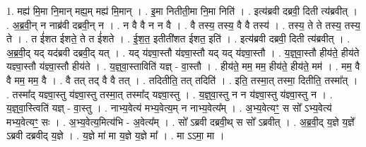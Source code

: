 \documentclass[17pt]{extarticle}
\begin{document}
1. मह्य॑ मि॒मा नि॒मान् मह्य॒म् मह्य॑ मि॒मान् । . इ॒मा नितीती॒मा नि॒मा निति॑ । . इत्य॑ब्रवी दब्रवी॒ दिती त्य॑ब्रवीत् । . अ॒ब्र॒वी॒न् न नाब्र॑वी दब्रवी॒न् न । . न वै वै न न वै । . वै तस्य॒ तस्य॒ वै वै तस्य॑ । . तस्य॒ ते ते तस्य॒ तस्य॒ ते । . त ई॑शत ईशते॒ ते त ई॑शते । . ई॒श॒त॒ इतीती॑शत ईशत॒ इति॑ । . इत्य॑ब्रवी दब्रवी॒ दिती त्य॑ब्रवीत् । . अ॒ब्र॒वी॒द् यद् यद॑ब्रवी दब्रवी॒द् यत् । . यद् य॑ज्ञ्वा॒स्तौ य॑ज्ञ्वा॒स्तौ यद् यद् य॑ज्ञ्वा॒स्तौ । . य॒ज्ञ्॒वा॒स्तौ हीय॑ते॒ हीय॑ते यज्ञ्वा॒स्तौ य॑ज्ञ्वा॒स्तौ हीय॑ते । . य॒ज्ञ्॒वा॒स्ताविति॑ यज्ञ् - वा॒स्तौ । . हीय॑ते॒ मम॒ मम॒ हीय॑ते॒ हीय॑ते॒ मम॑ । . मम॒ वै वै मम॒ मम॒ वै । . वै तत् तद् वै वै तत् । . तदितीति॒ तत् तदिति॑ । . इति॒ तस्मा॒त् तस्मा॒ दितीति॒ तस्मा᳚त् । . तस्मा᳚द् यज्ञ्वा॒स्तु य॑ज्ञ्वा॒स्तु तस्मा॒त् तस्मा᳚द् यज्ञ्वा॒स्तु । . य॒ज्ञ्॒वा॒स्तु न न य॑ज्ञ्वा॒स्तु य॑ज्ञ्वा॒स्तु न । . य॒ज्ञ्॒वा॒स्त्विति॑ यज्ञ् - वा॒स्तु । . नाभ्य॒वेत्य॑ मभ्य॒वेत्य॒म् न नाभ्य॒वेत्य᳚म् । . अ॒भ्य॒वेत्यꣳ॒॒ स सो᳚ ऽभ्य॒वेत्य॑ मभ्य॒वेत्यꣳ॒॒ सः । . अ॒भ्य॒वेत्य॒मित्य॑भि - अ॒वेत्य᳚म् । . सो᳚ ऽब्रवी दब्रवी॒थ् स सो᳚ ऽब्रवीत् । . अ॒ब्र॒वी॒द् य॒ज्ञे य॒ज्ञे᳚ ऽब्रवी दब्रवीद् य॒ज्ञे । . य॒ज्ञे मा॑ मा य॒ज्ञे य॒ज्ञे मा᳚ । . मा ऽऽमा॒ मा । \newline
\end{document}
